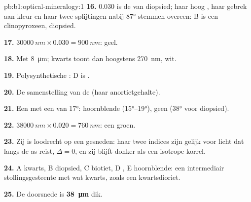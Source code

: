 \begin{solution}{pb:b1:optical-mineralogy:1}
\textbf{16.} $0.030$ is de  van diopsied; haar hoog , haar gebrek aan kleur en haar twee splijtingen
nabij \ang{87} stemmen overeen: B is een clinopyroxeen, diopsied.

\textbf{17.} $\qty{30000}{nm}\times0.030 = \qty{900}{nm}$:  geel.

\textbf{18.} Met \qty{8}{\micro m}; kwarts toont dan hoogstens \qty{270}{nm},  wit.

\textbf{19.} Polysynthetische : D is .

\textbf{20.} De samenstelling van de  (haar anortietgehalte).

\textbf{21.} Een  met een  van \ang{17}: hoornblende (\ang{15}--\ang{19}), geen  (\ang{38} voor diopsied).

\textbf{22.} $\qty{38000}{nm}\times0.020 = \qty{760}{nm}$: een  groen.

\textbf{23.} Zij is loodrecht op een  gesneden: haar twee indices zijn gelijk voor licht dat langs de as reist,
$\Delta = 0$, en zij blijft donker als een isotrope korrel.

\textbf{24.} A kwarts, B diopsied, C biotiet, D , E hoornblende: een intermediair stollingsgesteente met wat kwarts,
zoals een kwartsdioriet.

\textbf{25.} De doorsnede is \textbf{\qty[text-series-to-math=true]{38}{\micro m}} dik.
\end{solution}
